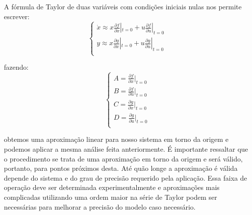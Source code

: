 \documentclass[journal]{IEEEtran}
\begin{document}
A fórmula de Taylor de duas variáveis com condições iniciais nulas 
nos permite escrever:
\begin{equation}
 \left\{
      \begin{array}{l}
       \dot{x} \approx x \frac{\partial f}{\partial x}|_{t = 0} + 
u\frac{\partial f}{\partial u}|_{t = 0}  \\
       y \approx x \frac{\partial g}{\partial x}|_{t = 0} + 
u\frac{\partial g}{\partial u}|_{t = 0}  \\
      \end{array}
 \right.
\end{equation}

fazendo:
\begin{equation}
 \left\{
      \begin{array}{l}
A = \frac{\partial f}{\partial x}|_{t = 0} \\
B = \frac{\partial f}{\partial u}|_{t = 0} \\
C = \frac{\partial g}{\partial x}|_{t = 0} \\
D = \frac{\partial g}{\partial u}|_{t = 0} \\
\end{array}
 \right.
\end{equation}

obtemos uma aproximação linear para nosso sistema em torno da origem e
podemos aplicar a mesma análise feita anteriormente. É importante 
ressaltar que o procedimento se trata de uma aproximação em torno da 
origem e será válido, portanto, para pontos próximos desta. Até quão
longe a aproximação é válida depende do sistema e do grau de precisão
requerido pela aplicação. Essa faixa de operação deve ser determinada 
experimentalmente e aproximações mais complicadas utilizando uma 
ordem maior na série de Taylor podem ser necessárias para melhorar 
a precisão do modelo caso necessário.





\end{document}
